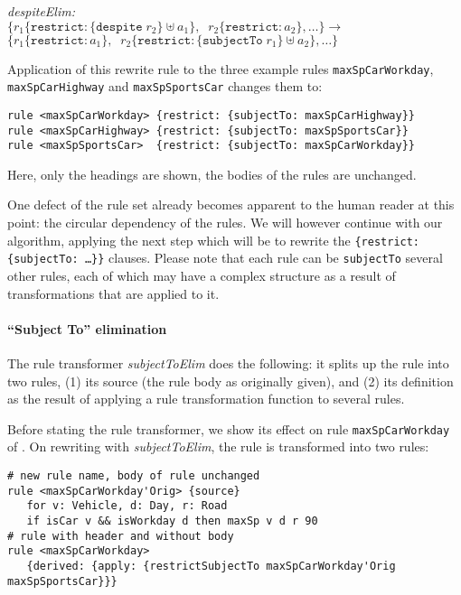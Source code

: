 \noindent
\emph{despiteElim:}\\
$
\{r_1 \{\mathtt{restrict}: \{\mathtt{despite}\; r_2\} \uplus a_1\},\;\;
r_2\{\mathtt{restrict}: a_2\}, \dots\} \longrightarrow$\\
$\{r_1 \{\mathtt{restrict}: a_1\},\;\;
r_2\{\mathtt{restrict}:  \{\mathtt{subjectTo}\; r_1\} \uplus a_2\}, \dots\}
$

\begin{example}\label{ex:rewrite_despite}
Application of this rewrite rule to the three example rules \texttt{maxSpCarWorkday},
\texttt{maxSpCarHighway} and  \texttt{maxSpSportsCar} changes them to:

\begin{lstlisting}[columns=fixed]
rule <maxSpCarWorkday> {restrict: {subjectTo: maxSpCarHighway}}
rule <maxSpCarHighway> {restrict: {subjectTo: maxSpSportsCar}}
rule <maxSpSportsCar>  {restrict: {subjectTo: maxSpCarWorkday}}
\end{lstlisting}
Here, only the headings are shown, the bodies of the rules are
unchanged. 
\end{example}

One defect of the rule set already becomes apparent to the human reader at
this point: the circular dependency of the rules. We will however continue
with our algorithm, applying the next step which will be to rewrite the
\texttt{\{restrict: \{subjectTo: \dots\}\}} clauses.  Please note that each
rule can be \texttt{subjectTo} several other rules, each of which may have a
complex structure as a result of transformations that are applied to it.

\paragraph{\textbf{``Subject To''  elimination}}

The rule transformer \emph{subjectToElim} does the following: it splits up the
rule into two rules, (1) its source (the rule body as originally given), and
(2) its definition as the result of applying a rule transformation function to
several rules.

\begin{example}\label{ex:rewrite_subject_to}
Before stating the rule transformer, we show its effect on rule
\texttt{maxSpCarWorkday} of . On rewriting
with \emph{subjectToElim}, the rule is transformed into two rules:

\begin{lstlisting}
# new rule name, body of rule unchanged
rule <maxSpCarWorkday'Orig> {source}
   for v: Vehicle, d: Day, r: Road
   if isCar v && isWorkday d then maxSp v d r 90
# rule with header and without body
rule <maxSpCarWorkday>
   {derived: {apply: {restrictSubjectTo maxSpCarWorkday'Orig  maxSpSportsCar}}}
\end{lstlisting}
\end{example}

